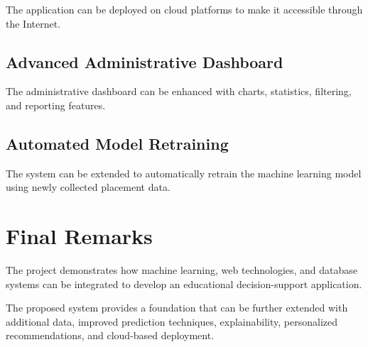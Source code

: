 \documentclass[12pt,a4paper]{report}
\begin{document}
The application can be deployed on cloud platforms to make it
accessible through the Internet.

\subsection{Advanced Administrative Dashboard}

The administrative dashboard can be enhanced with charts,
statistics, filtering, and reporting features.

\subsection{Automated Model Retraining}

The system can be extended to automatically retrain the machine
learning model using newly collected placement data.

\section{Final Remarks}

The project demonstrates how machine learning, web technologies,
and database systems can be integrated to develop an educational
decision-support application.

The proposed system provides a foundation that can be further
extended with additional data, improved prediction techniques,
explainability, personalized recommendations, and cloud-based
deployment.


\clearpage

\renewcommand{\bibname}{References}

\end{document}
